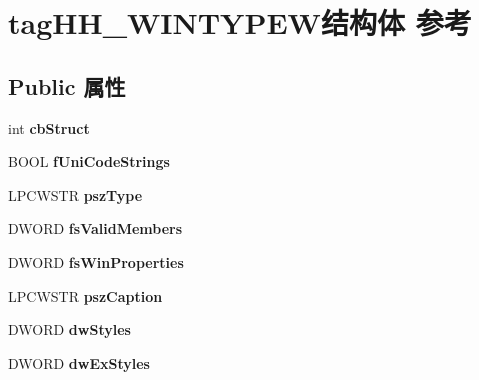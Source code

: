 \hypertarget{structtag_h_h___w_i_n_t_y_p_e_w}{}\section{tag\+H\+H\+\_\+\+W\+I\+N\+T\+Y\+P\+E\+W结构体 参考}
\label{structtag_h_h___w_i_n_t_y_p_e_w}
\subsection*{Public 属性}
\begin{DoxyCompactItemize}
\item 
\mbox{\label{structtag_h_h___w_i_n_t_y_p_e_w_aa08fe8ae11ec674a469aa019873c968d}} 
int {\bfseries cb\+Struct}
\item 
\mbox{\label{structtag_h_h___w_i_n_t_y_p_e_w_ac42c727dbcd3d7215706836d0f2224e3}} 
B\+O\+OL {\bfseries f\+Uni\+Code\+Strings}
\item 
\mbox{\label{structtag_h_h___w_i_n_t_y_p_e_w_a98fc195ea3fad28a02ec9bf371bda067}} 
L\+P\+C\+W\+S\+TR {\bfseries psz\+Type}
\item 
\mbox{\label{structtag_h_h___w_i_n_t_y_p_e_w_a91855bc0a7a350dbbee6a829c7a43aec}} 
D\+W\+O\+RD {\bfseries fs\+Valid\+Members}
\item 
\mbox{\label{structtag_h_h___w_i_n_t_y_p_e_w_ac2296d2a9baf1d3a50cc2684bd5f4c3d}} 
D\+W\+O\+RD {\bfseries fs\+Win\+Properties}
\item 
\mbox{\label{structtag_h_h___w_i_n_t_y_p_e_w_abbb75feae0f1584c1150aa1a40067c5a}} 
L\+P\+C\+W\+S\+TR {\bfseries psz\+Caption}
\item 
\mbox{\label{structtag_h_h___w_i_n_t_y_p_e_w_a2287c742e27c1d753b7ebbe56a04cddd}} 
D\+W\+O\+RD {\bfseries dw\+Styles}
\item 
\mbox{\label{structtag_h_h___w_i_n_t_y_p_e_w_a2dce8b03324c5f5ab375caacf6f9fd89}} 
D\+W\+O\+RD {\bfseries dw\+Ex\+Styles}

\end{DoxyCompactItemize}
